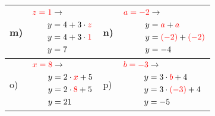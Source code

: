\documentclass[12pt]{article}
\begin{document}
\begin{xltabular}{\textwidth}{|C{0.75cm}|X|C{0.75cm}|X|}
\\\hline
m)&$\begin{aligned}
\textcolor{red}{z=1} & \rightarrow\\
y&=4 + 3 \cdot \textcolor{red}{z}\\
y&=4 + 3 \cdot \textcolor{red}{1}\\
y&=7\\
\end{aligned}$
&
n)&$\begin{aligned}
\textcolor{red}{a=-2} & \rightarrow\\
y&=\textcolor{red}{a} + \textcolor{red}{a}\\
y&=\textcolor{red}{(-2)} + \textcolor{red}{(-2)}\\
y&=-4\\
\end{aligned}$
\\\hline
o)&$\begin{aligned}
\textcolor{red}{x=8} & \rightarrow\\
y&=2 \cdot \textcolor{red}{x} + 5\\
y&=2 \cdot \textcolor{red}{8} + 5\\
y&=21\\
\end{aligned}$
&
p)&$\begin{aligned}
\textcolor{red}{b=-3} & \rightarrow\\
y&=3 \cdot \textcolor{red}{b} + 4\\
y&=3 \cdot \textcolor{red}{(-3)} + 4\\
y&=-5\\
\end{aligned}$
\\\hline
\end{xltabular}
\vspace{0.5cm}
\end{document}
